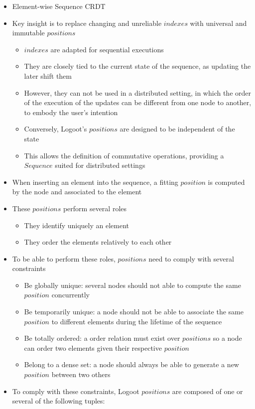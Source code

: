\documentclass{article}
\newcounter{definition-counter}
\theoremstyle{definition}
\begin{document}
\begin{itemize}
    \item Element-wise Sequence \ac{CRDT}
    \item Key insight is to replace changing and unreliable $indexes$ with universal and immutable $positions$
    \begin{itemize}
        \item $indexes$ are adapted for sequential executions
        \item They are closely tied to the current state of the sequence, as updating the later shift them
        \item However, they can not be used in a distributed setting, in which the order of the execution of the updates can be different from one node to another, to embody the user's intention
        \item Conversely, Logoot's $positions$ are designed to be independent of the state
        \item This allows the definition of commutative operations, providing a $Sequence$ suited for distributed settings
    \end{itemize}

    \item When inserting an element into the sequence, a fitting $position$ is computed by the node and associated to the element
    \item These $positions$ perform several roles
    \begin{itemize}
        \item They identify uniquely an element
        \item They order the elements relatively to each other
    \end{itemize}
    \item To be able to perform these roles, $positions$ need to comply with several constraints
    \begin{itemize}
        \item Be globally unique: several nodes should not able to compute the same $position$ concurrently
        \item Be temporarily unique: a node should not be able to associate the same $position$ to different elements during the lifetime of the sequence
        \item Be totally ordered: a order relation must exist over $positions$ so a node can order two elements given their respective $position$
        \item Belong to a dense set: a node should always be able to generate a new $position$ between two others
    \end{itemize}
    \item To comply with these constraints, Logoot $positions$ are composed of one or several of the following tuples:


\end{itemize}
\end{document}
